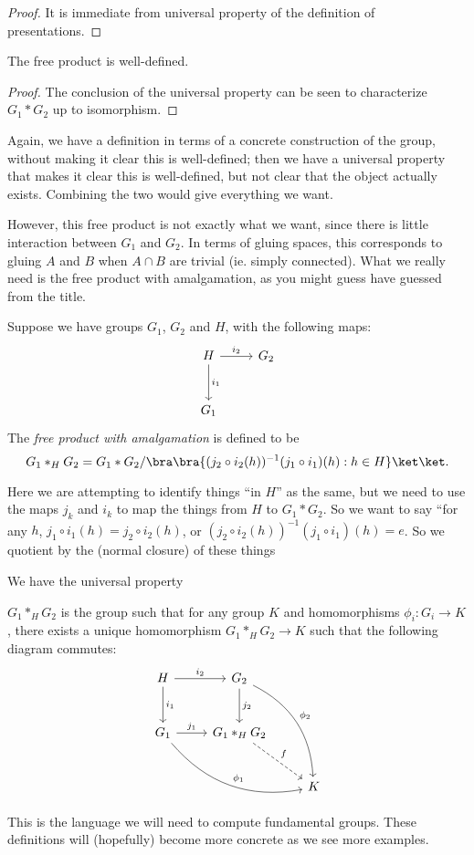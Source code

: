 \documentclass[a4paper]{article}
\begin{document}
\begin{proof}
  It is immediate from universal property of the definition of presentations.
\end{proof}

\begin{cor}
  The free product is well-defined.
\end{cor}

\begin{proof}
  The conclusion of the universal property can be seen to characterize $G_1 * G_2$ up to isomorphism.
\end{proof}

Again, we have a definition in terms of a concrete construction of the group, without making it clear this is well-defined; then we have a universal property that makes it clear this is well-defined, but not clear that the object actually exists. Combining the two would give everything we want.

However, this free product is not exactly what we want, since there is little interaction between $G_1$ and $G_2$. In terms of gluing spaces, this corresponds to gluing $A$ and $B$ when $A \cap B$ are trivial (ie. simply connected). What we really need is the free product with amalgamation, as you might guess have guessed from the title.

\begin{defi}
  Suppose we have groups $G_1$, $G_2$ and $H$, with the following maps:
  \[
    \begin{tikzcd}[row sep=large]
      H \ar[r, "i_2"] \ar[d, "i_1"] & G_2\\
      G_1
    \end{tikzcd}
  \]
  The \emph{free product with amalgamation} is defined to be
  \[
    G_1 *_H G_2 = G_1 * G_2/ \bra \bra \{(j_2 \circ i_2(h))^{-1} (j_1 \circ i_1)(h): h\in H\}\ket \ket.
  \]
\end{defi}
Here we are attempting to identify things ``in $H$'' as the same, but we need to use the maps $j_k$ and $i_k$ to map the things from $H$ to $G_1 * G_2$. So we want to say ``for any $h$, $j_1 \circ i_1 (h) = j_2 \circ i_2(h)$, or $(j_2 \circ i_2(h))^{-1} (j_1 \circ i_1)(h) = e$. So we quotient by the (normal closure) of these things

We have the universal property
\begin{lemma}
  $G_1 *_H G_2$ is the group such that for any group $K$ and homomorphisms $\phi_i: G_i \to K$, there exists a unique homomorphism $G_1 *_H G_2 \to K$ such that the following diagram commutes:
  \[
    \begin{tikzcd}[row sep=large]
      H \ar[r, "i_2"] \ar[d, "i_1"] & G_2 \ar[rdd, bend left, "\phi_2"] \ar[d, "j_2"]\\
      G_1 \ar[rrd, bend right, "\phi_1"] \ar [r, "j_1"] & G_1 *_H G_2 \ar [rd, dashed, "f"]\\
      && K
    \end{tikzcd}
  \]
\end{lemma}
This is the language we will need to compute fundamental groups. These definitions will (hopefully) become more concrete as we see more examples.
\end{document}

